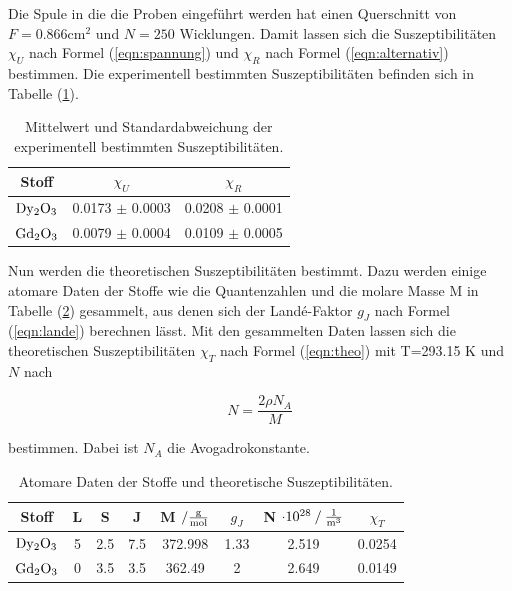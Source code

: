 \noindent 
Die Spule in die die Proben eingeführt werden hat einen Querschnitt von $F=0.866\si{\centi\meter\squared}$ und $N=250$ Wicklungen.
Damit lassen sich die Suszeptibilitäten $\chi_U$ nach Formel (\ref{eqn:spannung})
und $\chi_R$ nach Formel (\ref{eqn:alternativ})
bestimmen.
Die experimentell bestimmten Suszeptibilitäten befinden sich in Tabelle (\ref{tab:expsus}).

\begin{table}
    \centering
    \caption{Mittelwert und Standardabweichung der experimentell bestimmten Suszeptibilitäten.}
    \begin{tabular}{c c c}
        \toprule
        {Stoff} & {$\chi_U $} & {$\chi_R $} \\
    \midrule
    $\ce{Dy2O3}$ & 0.0173 $\pm$ 0.0003  &  0.0208 $\pm$ 0.0001 \\
    $\ce{Gd2O3}$ & 0.0079 $\pm$ 0.0004  &  0.0109 $\pm$ 0.0005 \\
    \bottomrule
\end{tabular}
\label{tab:expsus}
\end{table}

\newpage
\noindent
Nun werden die theoretischen Suszeptibilitäten bestimmt.
Dazu werden einige atomare Daten der Stoffe wie die Quantenzahlen und die molare Masse M in Tabelle (\ref{tab:th1}) gesammelt, aus denen sich der Landé-Faktor $g_J$ nach Formel (\ref{eqn:lande})
berechnen lässt.
Mit den gesammelten Daten lassen sich die theoretischen Suszeptibilitäten $\chi_T$ nach Formel (\ref{eqn:theo}) mit T=293.15 K und $N$ nach 

\begin{equation}
N = \frac{2\rho N_A}{M}
\end{equation}

\noindent
bestimmen. 
Dabei ist $N_A$ die Avogadrokonstante.


\begin{table}
    \centering
    \caption{Atomare Daten der Stoffe und theoretische Suszeptibilitäten.}
    \begin{tabular}{c c c c c c c c}
        \toprule
        {Stoff} & {L} & {S} & {J} & {M $\mathbin{/} \si[per-mode=fraction]{\gram\per\mol}$ } & {$g_J$} & {N $\cdot 10^{28} \mathbin{/} \si[per-mode=fraction]{\per\cubic\meter} $} & {$\chi_T$} \\
    \midrule
    $\ce{Dy2O3}$ & 5 & 2.5 & 7.5 & 372.998 & 1.33 & 2.519 & 0.0254 \\
    $\ce{Gd2O3}$ & 0 & 3.5 & 3.5 & 362.49  & 2    & 2.649 & 0.0149 \\
    \bottomrule
\end{tabular}
\label{tab:th1}
\end{table}